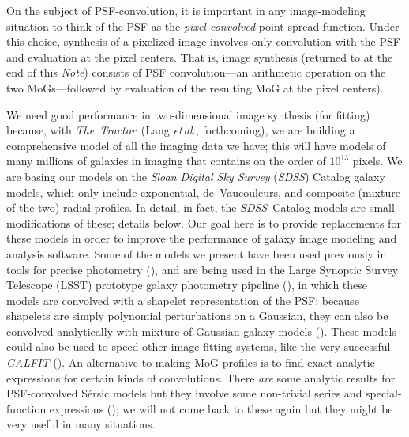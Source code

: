 \documentclass[12pt,pdftex,preprint]{aastex}
\newcommand{\foreign}[1]{\textit{#1}}
\newcommand{\etal}{\foreign{et\,al.}}
\newcommand{\documentname}{\textsl{Note}}
\newcommand{\project}[1]{\textsl{#1}}
\newcommand{\thetractor}{\project{The~Tractor}}
\newcommand{\sdss}{\project{SDSS}}
\begin{document}
On the subject of PSF-convolution, it is important in any
image-modeling situation to think of the PSF as the
\emph{pixel-convolved} point-spread function.  Under this choice,
synthesis of a pixelized image involves only convolution with the PSF
and evaluation at the pixel centers.  That is, image synthesis
(returned to at the end of this \documentname) consists of PSF
convolution---an arithmetic operation on the two MoGs---followed by
evaluation of the resulting MoG at the pixel centers).

We need good performance in two-dimensional image synthesis (for
fitting) because, with \thetractor\ (Lang \etal, forthcoming), we are
building a comprehensive model of all the imaging data we have; this
will have models of many millions of galaxies in imaging that contains
on the order of $10^{13}$ pixels.  We are basing our models on the
\project{Sloan Digital Sky Survey} (\sdss) Catalog galaxy models,
which only include exponential, de~Vaucouleurs, and composite (mixture
of the two) radial profiles.  In detail, in fact, the \sdss\ Catalog
models are small modifications of these; details below.  Our goal
here is to provide replacements for these models in order to improve
the performance of galaxy image modeling and analysis software.  Some
of the models we present have been used previously in tools for
precise photometry (\citealt{bundy}), and are being used in the Large
Synoptic Survey Telescope (LSST) prototype galaxy photometry pipeline
(\citealt{shaw}), in which these models are convolved with a shapelet
representation of the PSF; because shapelets are simply polynomial
perturbations on a Gaussian, they can also be convolved analytically
with mixture-of-Gaussian galaxy models (\citealt{bosch}).  These
models could also be used to speed other image-fitting systems, like
the very successful \project{GALFIT} (\citealt{galfit}).  An
alternative to making MoG profiles is to find exact analytic
expressions for certain kinds of convolutions.  There \emph{are} some
analytic results for PSF-convolved S\'ersic models but they involve
some non-trivial series and special-function expressions
(\citealt{trujillo}); we will not come back to these again but they
might be very useful in many situations.
\end{document}
